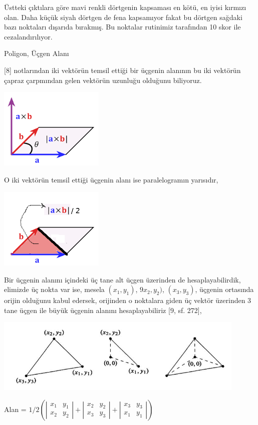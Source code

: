 \documentclass[12pt,fleqn]{article}\usepackage{../../common}
\begin{document}
Üstteki çıktılara göre mavi renkli dörtgenin kapsaması en kötü, en iyisi
kırmızı olan. Daha küçük siyah dörtgen de fena kapsamıyor fakat bu dörtgen
sağdaki bazı noktaları dışarıda bırakmış. Bu noktalar rutinimiz tarafından
10 skor ile cezalandırılıyor.

Poligon, Üçgen Alanı

[8] notlarından iki vektörün temsil ettiği bir üçgenin alanının bu iki vektörün
çapraz çarpmından gelen vektörün uzunluğu olduğunu biliyoruz. 

\includegraphics[width=5cm]{triar4.png}

O iki vektörün temsil ettiği üçgenin alanı ise paralelogramın yarısıdır,

\includegraphics[width=5cm]{triar3.png}

Bir üçgenin alanını içindeki üç tane alt üçgen üzerinden de hesaplayabilirdik,
elimizde üç nokta var ise, mesela $(x_1,y_1)$, $9x_2,y_2)$, $(x_3,y_3)$, üçgenin
ortasında orijin olduğunu kabul edersek, orijinden o noktalara giden üç vektör
üzerinden 3 tane üçgen ile büyük üçgenin alanını hesaplayabiliriz [9, sf. 272],

\includegraphics[width=12cm]{triar5.jpg}

Alan = $1/2 \left( 
\left|\begin{array}{cc}
x_1 & y_1 \\ x_2 & y_2 
\end{array}\right| + 
\left|\begin{array}{cc}
x_2 & y_2 \\ x_3 & y_3 
\end{array}\right| + 
\left|\begin{array}{cc}
x_3 & y_3 \\ x_1 & y_1
\end{array}\right| \right)
$
\end{document}
